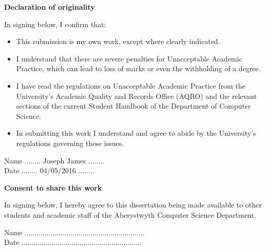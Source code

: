 \thispagestyle{empty}

\begin{center}
    {\LARGE\bf Declaration of originality}
\end{center}

In signing below, I confirm that:

\begin{itemize}
\item{This submission is my own work, except where 
clearly indicated.}

\item{I understand that there are severe penalties for 
Unacceptable Academic Practice, which can lead to loss 
of marks or even the withholding of a degree.}
 
\item{I have read the regulations on Unacceptable Academic 
Practice from the University's Academic Quality and 
Records Office (AQRO) and the relevant sections of the 
current Student Handbook of the Department of 
Computer Science.}
 
\item{In submitting this work I understand and agree to 
abide by the University's regulations governing these issues.}
\end{itemize}

\vspace{2em}
Name ........ Joseph James ........ \\

\vspace{1em}
Date  ........ 04/05/2016 ........\\

\vspace{1em}
\begin{center}
    {\LARGE\bf Consent to share this work}
\end{center}

In signing below, I hereby agree to this dissertation being made available to other
students and academic staff of the Aberystwyth Computer Science Department.  

\vspace{2em}
Name ............................................................  \\

\vspace{1em}
Date ............................................................ \\


